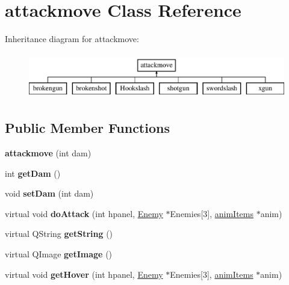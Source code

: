 \hypertarget{classattackmove}{\section{attackmove Class Reference}
\label{classattackmove}
}
Inheritance diagram for attackmove\-:\begin{figure}[H]
\begin{center}
\leavevmode
\includegraphics[height=2.000000cm]{classattackmove}
\end{center}
\end{figure}
\subsection*{Public Member Functions}
\begin{DoxyCompactItemize}
\item 
\hypertarget{classattackmove_aeef16b72f9b3b146208a9db33e328b38}{{\bfseries attackmove} (int dam)}\label{classattackmove_aeef16b72f9b3b146208a9db33e328b38}

\item 
\hypertarget{classattackmove_aa971a4aef1cfb1c2ef54301e67e620a6}{int {\bfseries get\-Dam} ()}\label{classattackmove_aa971a4aef1cfb1c2ef54301e67e620a6}

\item 
\hypertarget{classattackmove_a103d4b29b142a466d564de825cf21458}{void {\bfseries set\-Dam} (int dam)}\label{classattackmove_a103d4b29b142a466d564de825cf21458}

\item 
\hypertarget{classattackmove_a80a498f0903dbe791bb1e0faacb54870}{virtual void {\bfseries do\-Attack} (int hpanel, \hyperlink{class_enemy}{Enemy} $\ast$Enemies\mbox{[}3\mbox{]}, \hyperlink{classanim_items}{anim\-Items} $\ast$anim)}\label{classattackmove_a80a498f0903dbe791bb1e0faacb54870}

\item 
\hypertarget{classattackmove_ada49eedf4b893372c576edd48fe73161}{virtual Q\-String {\bfseries get\-String} ()}\label{classattackmove_ada49eedf4b893372c576edd48fe73161}

\item 
\hypertarget{classattackmove_aca59a2343b7a6c195d300dda5c8d952d}{virtual Q\-Image {\bfseries get\-Image} ()}\label{classattackmove_aca59a2343b7a6c195d300dda5c8d952d}

\item 
\hypertarget{classattackmove_a0ff82349551bd72f4d57b3367bb318fa}{virtual void {\bfseries get\-Hover} (int hpanel, \hyperlink{class_enemy}{Enemy} $\ast$Enemies\mbox{[}3\mbox{]}, \hyperlink{classanim_items}{anim\-Items} $\ast$anim)}\label{classattackmove_a0ff82349551bd72f4d57b3367bb318fa}

\end{DoxyCompactItemize}
